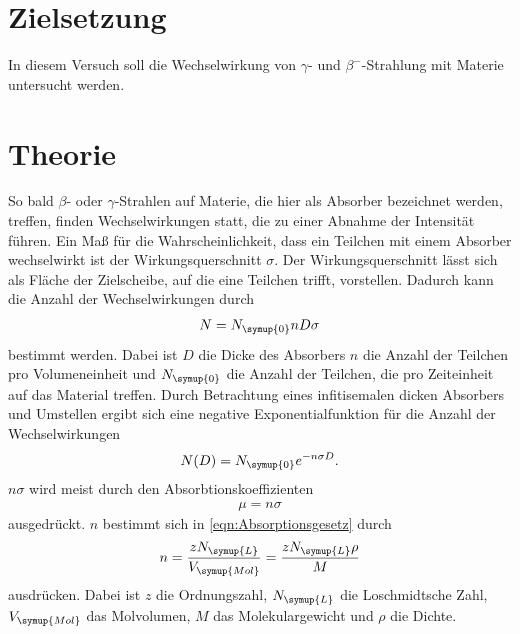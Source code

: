 \section{Zielsetzung}
\label{sec:Zielsetzung}
In diesem Versuch soll die Wechselwirkung von $\gamma$- und $\beta^{-}$-Strahlung mit Materie untersucht werden.

\section{Theorie}
\label{sec:Theorie}
So bald $\beta$- oder $\gamma$-Strahlen auf Materie, die hier als Absorber bezeichnet werden, treffen, finden
Wechselwirkungen statt, die zu einer Abnahme der Intensität führen. Ein Maß für die Wahrscheinlichkeit, dass
ein Teilchen mit einem Absorber wechselwirkt ist der Wirkungsquerschnitt $\sigma$. Der Wirkungsquerschnitt lässt
sich als Fläche der Zielscheibe, auf die eine Teilchen trifft, vorstellen. Dadurch kann die Anzahl der
Wechselwirkungen durch
\begin{align*}
    N = N_{\symup{0}} n D \sigma
\end{align*}
bestimmt werden. Dabei ist $D$ die Dicke des Absorbers $n$ die Anzahl der Teilchen pro Volumeneinheit und
$N_{\symup{0}}$ die Anzahl der Teilchen, die pro Zeiteinheit auf das Material treffen. Durch Betrachtung eines
infitisemalen dicken Absorbers und Umstellen ergibt sich eine negative Exponentialfunktion für die Anzahl der
Wechselwirkungen
\begin{align}
    \label{eqn:Absorptionsgesetz}
    N(D) = N_{\symup{0}} e^{-n \sigma D}.
\end{align}
$n \sigma$ wird meist durch den Absorbtionskoeffizienten
\begin{align}
    \label{eqn:Absorbtionskoeffizient}
    \mu = n\sigma
\end{align}
ausgedrückt. $n$ bestimmt sich in \autoref{eqn:Absorptionsgesetz} durch
\begin{align*}
    n = \frac{zN_{\symup{L}}}{V_{\symup{Mol}}} = \frac{zN_{\symup{L}}\rho}{M}
\end{align*}
ausdrücken. Dabei ist $z$ die Ordnungszahl, $N_{\symup{L}}$ die Loschmidtsche Zahl, $V_{\symup{Mol}}$ das
Molvolumen, $M$ das Molekulargewicht und $\rho$ die Dichte.

